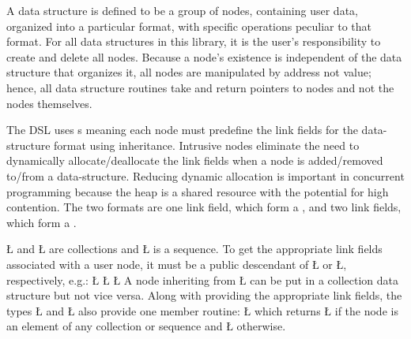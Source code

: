 \documentclass[openright,twoside]{report}
\begin{document}
A data structure is defined to be a group of nodes, containing user data, organized into a particular format, with specific operations peculiar to that format.
For all data structures in this library, it is the user's responsibility to create and delete all nodes.
Because a node's existence is independent of the data structure that organizes it, all nodes are manipulated by address not value;
hence, all data structure routines take and return pointers to nodes and not the nodes themselves.

The \uC DSL uses s meaning each node must predefine the link fields for the data-structure format using inheritance.
Intrusive nodes eliminate the need to dynamically allocate/deallocate the link fields when a node is added/removed to/from a data-structure.
Reducing dynamic allocation is important in concurrent programming because the heap is a shared resource with the potential for high contention.
The two formats are one link field, which form a , and two link fields, which form a .
\begin{center}

\end{center}
\LGinlinetrue\LGbegin\lgrinde\L{}\endlgrinde\LGend{} and \LGinlinetrue\LGbegin\lgrinde\L{}\endlgrinde\LGend{} are collections and \LGinlinetrue\LGbegin\lgrinde\L{}\endlgrinde\LGend{} is a sequence.
To get the appropriate link fields associated with a user node, it must be a public descendant of \LGinlinetrue\LGbegin\lgrinde\L{}\endlgrinde\LGend{} or \LGinlinetrue\LGbegin\lgrinde\L{}\endlgrinde\LGend{}, respectively, e.g.:
\LGinlinefalse\LGbegin\lgrinde
\L{}
\L{}
\L{}
\endlgrinde\LGend
A node inheriting from \LGinlinetrue\LGbegin\lgrinde\L{}\endlgrinde\LGend{} can be put in a collection data structure but not vice versa.
Along with providing the appropriate link fields, the types \LGinlinetrue\LGbegin\lgrinde\L{}\endlgrinde\LGend{} and \LGinlinetrue\LGbegin\lgrinde\L{}\endlgrinde\LGend{} also provide one member routine:
\LGinlinefalse\LGbegin\lgrinde
\L{}
\endlgrinde\LGend
{}%
%
which returns \LGinlinetrue\LGbegin\lgrinde\L{}\endlgrinde\LGend{} if the node is an element of any collection or sequence and \LGinlinetrue\LGbegin\lgrinde\L{}\endlgrinde\LGend{} otherwise.
\end{document}
